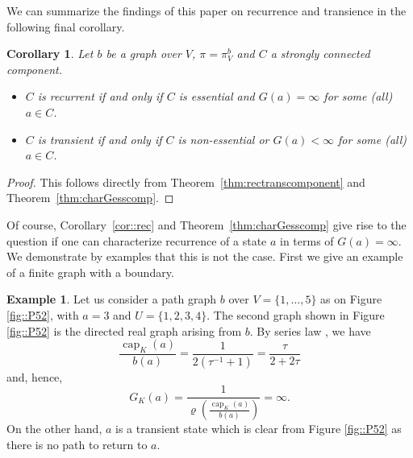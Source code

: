 \documentclass[a4paper,oneside, 12pt]{amsart}
\numberwithin{theorem}{section}
\newtheorem{corollary}[theorem]{Corollary}
\theoremstyle{definition}
\newtheorem{example}[theorem]{Example}
\renewcommand{\c}{\operatorname{cap}}
\newcommand{\G}{{G}}
\newcommand{\map}{\varrho}
\newcommand{\prob}{\pi}
\begin{document}
{We can summarize the findings of this paper on recurrence and transience in the following final corollary.

\begin{corollary}\label{cor:charGesscomp}
	Let $b$ be a  graph over $V$,  $ \prob=\prob_{V}^{b} $ and $ C $  a strongly connected  component.
	\begin{itemize}
		\item [(a)]  $ C $ is recurrent if and only if $ C $ is essential and  $\G(a)=\infty$ for some (all) $a\in C$.
		\item [(b)]  $ C $ is transient if and only if $ C $ is non-essential or $\G(a)<\infty$ for some (all) $a\in C$.
	\end{itemize}
\end{corollary}
\begin{proof}
	This follows directly from Theorem~\ref{thm:rectranscomponent} and Theorem~\ref{thm:charGesscomp}.
\end{proof}

Of course, Corollary~\ref{cor::rec}  and Theorem~\ref{thm:charGesscomp} give rise to the question if one can characterize recurrence of a state $ a $ in terms of $ \G(a)=\infty $. We demonstrate by examples that this is not the case. First we give an example of a finite graph with a boundary.

\begin{example}\label{ex1}
Let us consider a path graph $ b $ over $ V=\{1,\ldots,5\} $ as on Figure \ref{fig::P52}, with $a=3$ and $U=\{1,2,3,4\}$. The second graph shown in  Figure \ref{fig::P52} is the directed real graph arising from $ b $. By series law \cite[Corollary~6]{Muranova2},  we have
$$
\frac{\c_K(a)}{b(a)}=\dfrac{1}{2(\tau^{-1}+1)}=\dfrac{\tau}{2+2 \tau}
$$
and, hence,
$$
\G_K(a)=\dfrac{1}{\displaystyle\map\left( \frac{\c_K(a)}{b(a)}\right)}=\infty.
$$
On the other hand, $a$ is a transient state which is clear from Figure \ref{fig::P52} as there is no path to return to $ a $.

\begin{figure}[H]
\centering
{}
\end{figure}
\end{example}}
\end{document}
